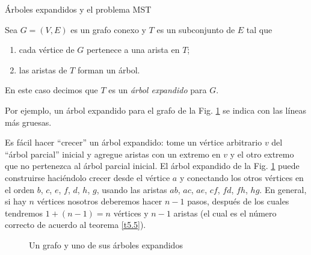 \begin{section}{Árboles expandidos y el problema MST} \label{seccion-erboles-expandidos-mst}

\begin{definicion}
    Sea  $G=(V,E)$ es un grafo conexo y  $T$ es un subconjunto de $E$ tal que
    \begin{enumerate}[label=\textit{\alph*)}]
        \item  cada vértice de $G$ pertenece a una arista en $T$;
        \item  las aristas de $T$ forman un árbol.
    \end{enumerate}
    En este caso decimos que $T$ es un \textit{árbol expandido} para  $G$.  
\end{definicion}
   Por ejemplo, un árbol expandido para el grafo de la Fig. \ref{f6.3} se indica con las líneas más gruesas.

Es fácil hacer ``crecer'' un árbol expandido: tome un vértice arbitrario $v$ del ``árbol parcial'' inicial y agregue aristas con un extremo en $v$ y el otro extremo que no pertenezca al árbol parcial inicial. El árbol expandido de la Fig. \ref{f6.3} puede construirse haciéndolo crecer desde el vértice $a$ y conectando los otros vértices en el orden $b$, $c$, $e$, $f$, $d$, $h$, $g$, usando las aristas $ab$, $ac$, $ae$, $cf$,  $fd$, $fh$, $hg$. En general, si hay $n$ vértices nosotros deberemos hacer $n-1$ pasos, después de los cuales tendremos $1+(n-1)=n$ vértices y $n-1$ aristas (el cual es el número correcto de acuerdo al teorema \ref{t5.5}).

\begin{figure}[ht]
    \begin{center}
    \end{center}
    \caption{Un grafo y uno de sus árboles expandidos} \label{f6.3}
\end{figure}



\end{section}
